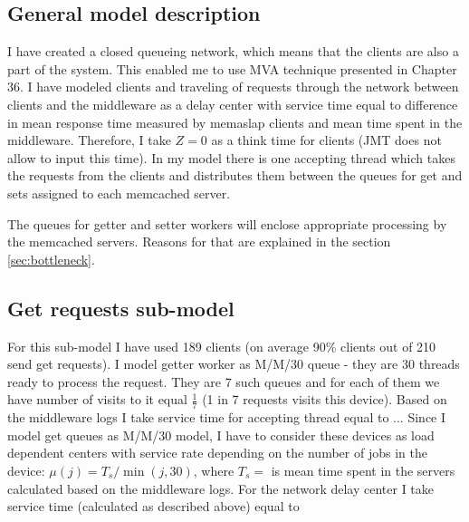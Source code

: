 \documentclass[11pt]{article}
\begin{document}
\subsection{General model description}

I have created a closed queueing network, which means that the clients are also a part of the system. This enabled me to use MVA technique presented in Chapter 36. I have modeled clients and traveling of requests through the network between clients and the middleware as a delay center with service time equal to difference in mean response time measured by memaslap clients and mean time spent in the middleware. Therefore, I take $Z=0$ as a think time for clients (JMT does not allow to input this time). In my model there is one accepting thread which takes the requests from the clients and distributes them between the queues for get and sets assigned to each memcached server. 

The queues for getter and setter workers will enclose appropriate processing by the memcached servers. Reasons for that are explained in the section \ref{sec:bottleneck}.

\subsection{Get requests sub-model}

For this sub-model I have used 189 clients (on average 90\% clients out of 210 send get requests). I model getter worker as M/M/30 queue - they are 30 threads ready to process the request. They are 7 such queues and for each of them we have number of visits to it equal $\frac{1}{7}$ (1 in 7 requests visits this device).
Based on the middleware logs I take service time for accepting thread equal to ...
Since I model get queues as M/M/30 model, I have to consider these devices as load dependent centers with service rate depending on the number of jobs in the device: $\mu(j) = T_s / \min(j, 30)$, where $T_s = $
is mean time spent in the servers calculated based on the middleware logs. 
For the network delay center I take service time (calculated as described above) equal to
\end{document}
